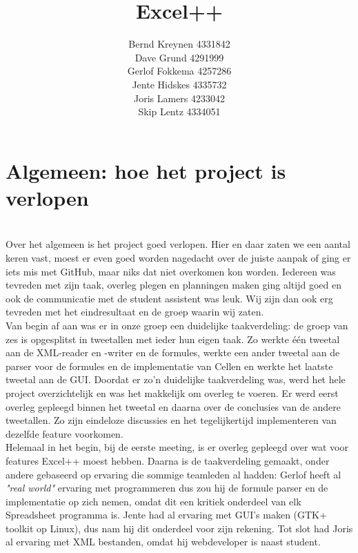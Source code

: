 \documentclass[a4paper,11pt]{article}
\title{Excel++}
\author{Bernd Kreynen 4331842\\
		Dave Grund 4291999\\
		Gerlof Fokkema 4257286\\
		Jente Hidskes 4335732\\
		Joris Lamers 4233042\\
		Skip Lentz 4334051\\
	   }
\begin{document}
\begin{titlepage}
\maketitle
\thispagestyle{empty} %
\end{titlepage}

\newpage\section{Algemeen: hoe het project is verlopen}\mbox{} \\
Over het algemeen is het project goed verlopen. Hier en daar zaten we een aantal keren vast, moest er even goed worden nagedacht over de juiste aanpak of ging er iets mis met GitHub, maar niks dat niet overkomen kon worden. Iedereen was tevreden met zijn taak, overleg plegen en planningen maken ging altijd goed en ook de communicatie met de student assistent was leuk. Wij zijn dan ook erg tevreden met het eindresultaat en de groep waarin wij zaten.\\

Van begin af aan was er in onze groep een duidelijke taakverdeling: de groep van zes is opgesplitst in tweetallen met ieder hun eigen taak. Zo werkte één tweetal aan de XML-reader en -writer en de formules, werkte een ander tweetal aan de parser voor de formules en de implementatie van Cellen en werkte het laatste tweetal aan de GUI. Doordat er zo’n duidelijke taakverdeling was, werd het hele project overzichtelijk en was het makkelijk om overleg te voeren. Er werd eerst overleg gepleegd binnen het tweetal en daarna over de conclusies van de andere tweetallen. Zo zijn eindeloze discussies en het tegelijkertijd implementeren van dezelfde feature voorkomen.\\

Helemaal in het begin, bij de eerste meeting, is er overleg gepleegd over wat voor features Excel++ moest hebben. Daarna is de taakverdeling gemaakt, onder andere gebaseerd op ervaring die sommige teamleden al hadden: Gerlof heeft al \textit{"real world"} ervaring met programmeren dus zou hij de formule parser en de implementatie op zich nemen, omdat dit een kritiek onderdeel van elk Spreadsheet programma is. Jente had al ervaring met GUI’s maken (GTK+ toolkit op Linux), dus nam hij dit onderdeel voor zijn rekening. Tot slot had Joris al ervaring met XML bestanden, omdat hij webdeveloper is naast student.\\
\end{document}
